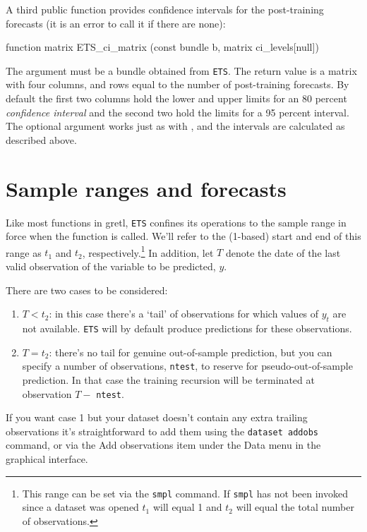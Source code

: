 \documentclass{article}
\begin{document}
A third public function provides confidence intervals for the
post-training forecasts (it is an error to call it if there are none):
\begin{nscode}
function matrix ETS_ci_matrix (const bundle b, matrix ci_levels[null])
\end{nscode}
The argument must be a bundle obtained from \texttt{ETS}. The return
value is a matrix with four columns, and rows equal to the number of
post-training forecasts. By default the first two columns hold the lower
and upper limits for an 80 percent \textit{confidence interval} and the
second two hold the limits for a 95 percent interval. The optional
 argument works just as with , and the
intervals are calculated as described above.

\section{Sample ranges and forecasts}
\label{sec:ranges}

Like most functions in gretl, \texttt{ETS} confines its operations
to the sample range in force when the function is called. We'll refer
to the (1-based) start and end of this range as $t_1$ and $t_2$,
respectively.\footnote{This range can be set via the \texttt{smpl}
  command. If \texttt{smpl} has not been invoked since a dataset was
  opened $t_1$ will equal 1 and $t_2$ will equal the total number of
  observations.}  In addition, let $T$ denote the date of the last
valid observation of the variable to be predicted, $y$.

There are two cases to be considered:
\begin{enumerate}
\item $T < t_2$: in this case there's a `tail' of observations for
  which values of $y_t$ are not available.  \texttt{ETS} will by
  default produce predictions for these observations.
\item $T = t_2$: there's no tail for genuine out-of-sample prediction,
  but you can specify a number of observations, \texttt{ntest}, to
  reserve for pseudo-out-of-sample prediction. In that case the
  training recursion will be terminated at observation $T-$
  \texttt{ntest}.
\end{enumerate}

If you want case 1 but your dataset doesn't contain any extra trailing
observations it's straightforward to add them using the
\texttt{dataset addobs} command, or via the \textsf{Add observations}
item under the \textsf{Data} menu in the graphical interface.
\end{document}
